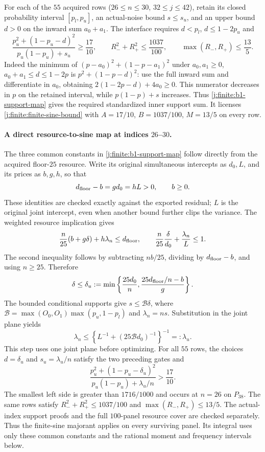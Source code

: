 For each of the $55$ acquired rows ($26\le n\le30$,
$32\le j\le42$), retain its closed probability interval
$[p_l,p_u]$, an actual-noise bound $s\le s_u$, and an upper
bound $d>0$ on the inward sum $a_0+a_1$.
The interface requires $d<p_l$, $d\le1-2p_u$ and
\begin{equation}\label{j:finite:b1-support-map}
 \frac{p_u^2+(1-p_u-d)^2}{p_u(1-p_u)+s_u}\ge\frac{17}{10},
 \qquad R_-^2+R_+^2\le\frac{1037}{100},
 \qquad \max(R_-,R_+)\le\frac{13}{5}.
\end{equation}
Indeed the minimum of $(p-a_0)^2+(1-p-a_1)^2$ under
$a_0,a_1\ge0$, $a_0+a_1\le d\le1-2p$ is
$p^2+(1-p-d)^2$: use the full inward sum and differentiate in
$a_0$, obtaining $2(1-2p-d)+4a_0\ge0$.
This numerator decreases in $p$ on the retained interval, while
$p(1-p)+s$ increases. Thus \eqref{j:finite:b1-support-map} gives the
required standardized inner support sum. It licenses
\eqref{j:finite:finite-sine-bound} with
$A=17/10$, $B=1037/100$, $M=13/5$ on every row.

\paragraph{A direct resource-to-sine map at indices $26$--$30$.}
The three common constants in \eqref{j:finite:b1-support-map} follow
directly from the acquired floor-$25$ resource.
Write its original simultaneous intercepts as $d_0,L$, and its prices
as $b,g,h$, so that
\[
 d_{\rm floor}-b=g d_0=hL>0,\qquad b\ge0.
\]
These identities are checked exactly against the exported residual;
$L$ is the original joint intercept, even when another bound further
clips the variance. The weighted resource implication gives
\[
 \frac n{25}(b+g\delta)+h\lambda_n\le d_{\rm floor},
 \qquad
 \frac n{25}\frac{\delta}{d_0}+\frac{\lambda_n}{L}\le1.
\]
The second inequality follows by subtracting $nb/25$, dividing by
$d_{\rm floor}-b$, and using $n\ge25$. Therefore
\[
 \delta\le \delta_u:=\min\left\{\frac{25d_0}{n},
                 \frac{25d_{\rm floor}/n-b}{g}\right\}.
\]
The bounded conditional supports give $s\le\mathcal B\delta$, where
$\mathcal B=\max(O_0,O_1)\max(p_u,1-p_l)$ and $\lambda_n=ns$.
Substitution in the joint plane yields
\[
 \lambda_n\le
 \left\{L^{-1}+(25\mathcal B d_0)^{-1}\right\}^{-1}=:\lambda_u.
\]
This step uses one joint plane before optimizing. For all $55$ rows,
the choices $d=\delta_u$ and $s_u=\lambda_u/n$ satisfy the two
preceding gates and
\[
 \frac{p_u^2+(1-p_u-\delta_u)^2}
      {p_u(1-p_u)+\lambda_u/n}>\frac{17}{10}.
\]
The smallest left side is greater than $1716/1000$ and occurs
at $n=26$ on $P_{38}$. The same rows satisfy
$R_-^2+R_+^2\le1037/100$ and $\max(R_-,R_+)\le13/5$.
The actual-index support proofs and the full $100$-panel resource
cover are checked separately. Thus the finite-sine majorant applies
on every surviving panel. Its integral uses only these common
constants and the rational moment and frequency intervals below.

